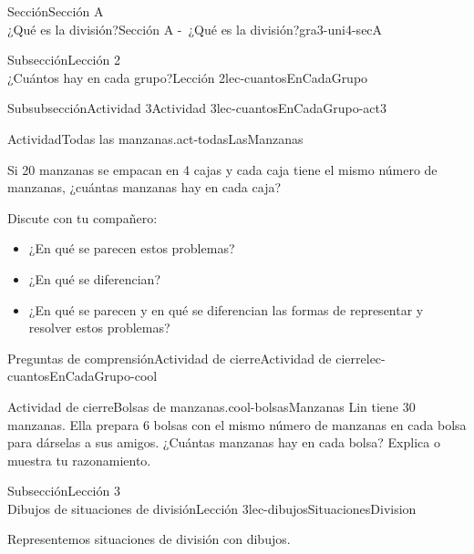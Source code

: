\begin{sectionptx}{Sección}{{\Large Sección A\\}¿Qué es la división?}{}{Sección A -~¿Qué es la división?}{}{}{gra3-uni4-secA}
\begin{subsectionptx}{Subsección}{{\normalsize Lección 2\\[-0.05cm]}¿Cuántos hay en cada grupo?}{}{Lección 2}{}{}{lec-cuantosEnCadaGrupo}
\begin{subsubsectionptx}{Subsubsección}{Actividad 3}{}{Actividad 3}{}{}{lec-cuantosEnCadaGrupo-act3}
\begin{activity}{Actividad}{Todas las manzanas.}{act-todasLasManzanas}
\begin{sidebyside}{2}{0.05}{0.05}{0.1}
\begin{sbspanel}{0.4}%
\par
Si 20 manzanas se empacan en 4 cajas y cada caja tiene el mismo número de manzanas, ¿cuántas manzanas hay en cada caja?%
\end{sbspanel}%
\end{sidebyside}%
\par
Discute con tu compañero:%
\par
%
\begin{itemize}[label=\textbullet]
\item{}¿En qué se parecen estos problemas?%
\item{}¿En qué se diferencian?%
\item{}¿En qué se parecen y en qué se diferencian las formas de representar y resolver estos problemas?%
\end{itemize}
%
\end{activity}%
\end{subsubsectionptx}
%
%
\typeout{************************************************}
\typeout{************************************************}
%
\begin{reading-questions-subsubsection}{Preguntas de comprensión}{Actividad de cierre}{}{Actividad de cierre}{}{}{lec-cuantosEnCadaGrupo-cool}
\begin{project}{Actividad de cierre}{Bolsas de manzanas.}{cool-bolsasManzanas}%
Lin tiene 30 manzanas. Ella prepara 6 bolsas con el mismo número de manzanas en cada bolsa para dárselas a sus amigos. ¿Cuántas manzanas hay en cada bolsa? Explica o muestra tu razonamiento.%
\end{project}%
\end{reading-questions-subsubsection}
\end{subsectionptx}
%
%
\typeout{************************************************}
\typeout{************************************************}
%
\begin{subsectionptx}{Subsección}{{\normalsize Lección 3\\[-0.05cm]}Dibujos de situaciones de división}{}{Lección 3}{}{}{lec-dibujosSituacionesDivision}
\begin{introduction}{}%
Representemos situaciones de división con dibujos.%
\end{introduction}%
%
%
\typeout{************************************************}
\typeout{************************************************}

\end{subsectionptx}
\end{sectionptx}
